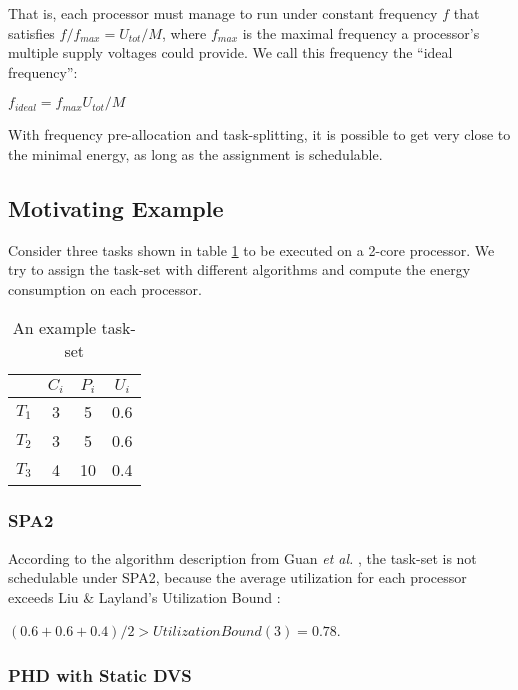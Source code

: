 \documentclass[12pt, journal,compsoc]{IEEEtran}
\begin{document}
That is, each processor must manage to run under constant frequency $f$ that satisfies $f/f_{max}=U_{tot}/M$, where $f_{max}$ is the maximal frequency a processor's multiple supply voltages could provide. We call this frequency the ``ideal frequency'':
\begin{center}
$f_{ideal} = f_{max} U_{tot}/M$\\
\end{center}

With frequency pre-allocation and task-splitting, it is possible to get very close to the minimal energy, as long as the assignment is schedulable.

\subsection{Motivating Example}

Consider three tasks shown in table \ref{edata} to be executed on a 2-core processor. We try to assign the task-set with different algorithms and compute the energy consumption on each processor.

\begin{table}[!t]
\caption{An example task-set}\label{edata}
\centering
\begin{tabular}{|c||c|c|c|}

\hline
& $C_i$ & $P_i$ & $U_i$\\
\hline
$T_1$ & 3 & 5 & 0.6\\
\hline
$T_2$ & 3 & 5 & 0.6\\
\hline
$T_3$ & 4 & 10 & 0.4\\
\hline
\end{tabular}
\end{table}



\subsubsection{SPA2}

According to the algorithm description from Guan \emph{et al.} \cite{Guan:2010:FMS:1828428.1829220}, the task-set is not schedulable under SPA2, because the average utilization for each processor exceeds Liu \& Layland's Utilization Bound \cite{Liu:1973:SAM:321738.321743}:

\begin{center}
$(0.6 + 0.6 + 0.4)/2 > UtilizationBound(3) = 0.78$.
\end{center}


\subsubsection{PHD with Static DVS}
\end{document}
